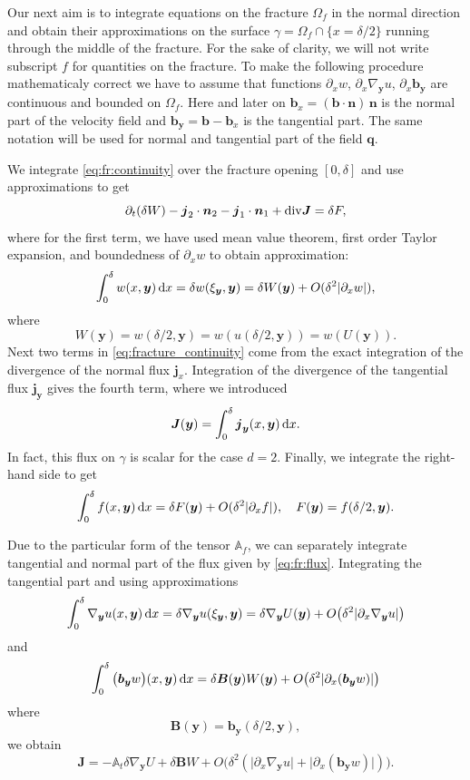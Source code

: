 \documentclass[a4paper]{article}
\def\prtl{\partial}
\def\vc#1{\mathbf{\boldsymbol{#1}}}     %
\def\tn#1{{\mathbb{#1}}}    %
\def\abs#1{\lvert#1\rvert}
\def\div{{\rm div}}
\def\grad{\nabla}
\def\d {\,{\rm d}}
\begin{document}
Our next aim is to integrate equations on the fracture $\Omega_f$ in the normal direction 
and obtain their approximations on the surface $\gamma=\Omega_f \cap \{x=\delta/2\}$ running through the middle of the fracture. 
For the sake of clarity, we will not write subscript $f$ for quantities on the fracture. 
To make the following procedure mathematicaly correct we have to assume that functions
$\prtl_x w$, $\prtl_x \grad_{\vc y} u$, $\prtl_x \vc b_{\vc y}$ are continuous and bounded on $\Omega_f$. Here and later on 
$\vc b_x=(\vc b \cdot \vc n)\, \vc n$ is the normal part of the velocity field and $\vc b_{\vc y} = \vc b - \vc b_x$ is the tangential part.
The same notation will be used for normal and tangential part of the field $\vc q$.

We integrate \eqref{eq:fr:continuity} over the fracture opening $[0,\delta]$ and use approximations to get
\begin{equation}
    \label{eq:fracture_continuity}
   \prtl_t (\delta W) - \vc j_2 \cdot \vc n_2 - \vc j_1 \cdot \vc n_1 + \div \vc J = \delta F,
\end{equation}
where for the first term, we have used mean value theorem, first order Taylor expansion, 
and boundedness of $\prtl_x w$ to obtain approximation:
\[
    \int_0^\delta w(x,\vc y) \d x=\delta w(\xi_{\vc y}, \vc y) = \delta W(\vc y) + O(\delta^2\abs{\prtl_x w}),
\]
where
\[
    W(\vc y)=w(\delta / 2,\vc y)=w(u(\delta/2,\vc y))=w(U(\vc y)).
\]
Next two terms in \eqref{eq:fracture_continuity} come from the exact integration 
of the divergence of the normal flux $\vc j_x$.
Integration of the divergence of the tangential flux $\vc j_{\vc y}$ gives the fourth term, where we introduced
\[
\vc J(\vc y) = \int_0^\delta \vc j_{\vc y}(x, \vc y) \d x.
\]
In fact, this flux on $\gamma$ is scalar for the case $d=2$. Finally, we integrate the right-hand side to get 
\[
    \int_0^\delta f(x,\vc y) \d x = \delta F(\vc y) + O(\delta^2\abs{\prtl_x f}),\quad F(\vc y)=f(\delta/2,\vc y). 
\]


Due to the particular form of the tensor $\tn A_f$, we can separately integrate tangential and normal
part of the flux given by \eqref{eq:fr:flux}. Integrating the tangential part and using approximations
\[
    \int_0^\delta  \grad_{\vc y} u(x, \vc y) \d x = \delta \grad_{\vc y} u (\xi_{\vc y}, \vc y) 
    = \delta \grad_{\vc y} U( \vc y) + O\big( \delta^2 \abs{\prtl_x\grad_{\vc y} u} \big) 
\]
and
\[
 \int_0^\delta \big(\vc b_{\vc y} w\big)(x, \vc y) \d x 
  = \delta \vc B(\vc y) W(\vc y) + O\big(\delta^2 \abs{\prtl_x(\vc b_{\vc y} w)} \big)
\]
where
\[
  \vc B(\vc y) = \vc b_{\vc y}(\delta/2, \vc y),
\]
we obtain
\begin{equation}
    \label{eq:fracture_darcy}
   \vc J = -\tn A_t \delta \grad_{\vc y} U + \delta \vc B W + O\big(\delta^2(\abs{\prtl_x\grad_{\vc y} u}+\abs{\prtl_x(\vc b_{\vc y} w)})\big).
\end{equation}
\end{document}
